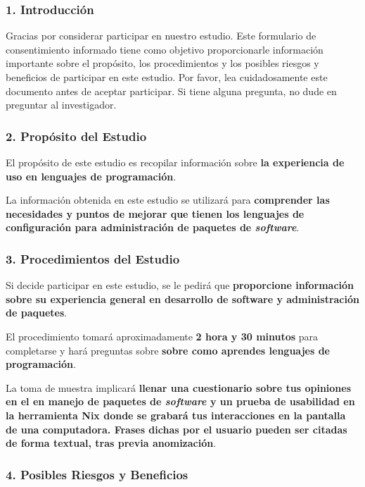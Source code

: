 \subsubsection{1. Introducción}

Gracias por considerar participar en nuestro estudio. Este formulario de consentimiento
informado tiene como objetivo proporcionarle información importante sobre el propósito, los
procedimientos y los posibles riesgos y beneficios de participar en este estudio. Por favor, lea
cuidadosamente este documento antes de aceptar participar. Si tiene alguna pregunta, no
dude en preguntar al investigador.

\subsubsection{2. Propósito del Estudio}

El propósito de este estudio es recopilar información sobre \textbf{la experiencia de uso en lenguajes de programación}.

La información obtenida en este estudio se utilizará para \textbf{comprender las necesidades y puntos de mejorar que tienen los lenguajes de configuración para administración de paquetes de \emph{software}}.

\subsubsection{3. Procedimientos del Estudio}

Si decide participar en este estudio, se le pedirá que \textbf{proporcione información sobre su experiencia general en desarrollo de software y administración de paquetes}.

El procedimiento tomará aproximadamente \textbf{2 hora y 30 minutos} para completarse y hará preguntas sobre \textbf{sobre como aprendes lenguajes de programación}.

La toma de muestra implicará \textbf{llenar una cuestionario sobre tus opiniones en el en manejo de paquetes de \emph{software} y un prueba de usabilidad en la herramienta Nix donde se grabará tus interacciones en la pantalla de una computadora. Frases dichas por el usuario pueden ser citadas de forma textual, tras previa anomización}.

\subsubsection{4. Posibles Riesgos y Beneficios}

